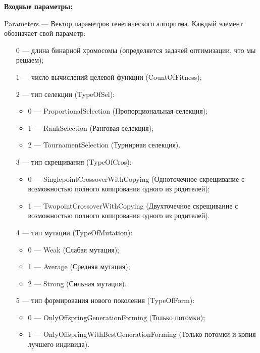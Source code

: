 \textbf{Входные параметры:}
 
Parameters --- Вектор параметров генетического алгоритма. Каждый элемент обозначает свой параметр:
 
 \begin{itemize}
 \item [0] --- длина бинарной хромосомы (определяется задачей оптимизации, что мы решаем);
 
 \item [1] --- число вычислений целевой функции (CountOfFitness);
 
 \item [2] --- тип селекции (TypeOfSel):
 
 \begin{itemize}
       \item 0 --- ProportionalSelection (Пропорциональная селекция);
 
       \item 1 --- RankSelection (Ранговая селекция);
 
       \item 2 --- TournamentSelection (Турнирная селекция).
	    \end{itemize}
 
 \item [3] --- тип скрещивания (TypeOfCros):
  \begin{itemize}
       \item 0 --- SinglepointCrossoverWithCopying (Одноточечное скрещивание с возможностью полного копирования одного из родителей);
 
       \item 1 --- TwopointCrossoverWithCopying (Двухточечное скрещивание с возможностью полного копирования одного из родителей).
	    \end{itemize}
 
 \item [4] --- тип мутации (TypeOfMutation):
  \begin{itemize}
       \item 0 --- Weak (Слабая мутация);
 
       \item 1 --- Average (Средняя мутация);
 
       \item 2 --- Strong (Сильная мутация).
	    \end{itemize}
 
 \item [5] --- тип формирования нового поколения (TypeOfForm):
  \begin{itemize}
       \item 0 --- OnlyOffspringGenerationForming (Только потомки);
 
       \item 1 --- OnlyOffspringWithBestGenerationForming (Только потомки и копия лучшего индивида).
	    \end{itemize}
 \end{itemize}
 
